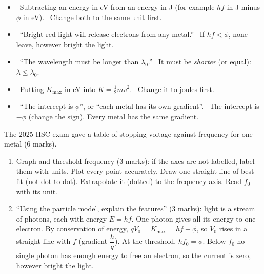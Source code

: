 \begin{mistakes}
\begin{itemize}
  \item \xmark\ Subtracting an energy in eV from an energy in J (for example $hf$ in J
        minus $\phi$ in eV). \cmark\ Change both to the same unit first.
  \item \xmark\ ``Bright red light will release electrons from any metal.''
        \cmark\ If $hf < \phi$, none leave, however bright the light.
  \item \xmark\ ``The wavelength must be longer than $\lambda_0$.''
        \cmark\ It must be \emph{shorter} (or equal): $\lambda \le \lambda_0$.
  \item \xmark\ Putting $K_\mathrm{max}$ in eV into $K = \frac12 mv^2$.
        \cmark\ Change it to joules first.
  \item \xmark\ ``The intercept is $\phi$'', or ``each metal has its own gradient''.
        \cmark\ The intercept is $-\phi$ (change the sign). Every metal has the
        same gradient.
\end{itemize}
\end{mistakes}

\begin{examtip}
The 2025 HSC exam gave a table of stopping voltage against frequency for one metal
(6 marks).
\begin{enumerate}
  \item Graph and threshold frequency (3 marks): if the axes are not labelled,
        label them with units. Plot every point accurately. Draw one straight line of best fit (not dot-to-dot). Extrapolate it
        (dotted) to the frequency axis. Read $f_0$ with its unit.
  \item ``Using the particle model, explain the features'' (3 marks): light is a
        stream of photons, each with energy $E = hf$. One photon gives all its energy
        to one electron. By conservation of energy, $qV_0 = K_\mathrm{max} = hf -
        \phi$, so $V_0$ rises in a straight line with $f$ (gradient $\dfrac{h}{q}$).
        At the threshold, $hf_0 = \phi$. Below $f_0$ no single photon has enough
        energy to free an electron, so the current is zero, however bright the light.
\end{enumerate}
\end{examtip}

